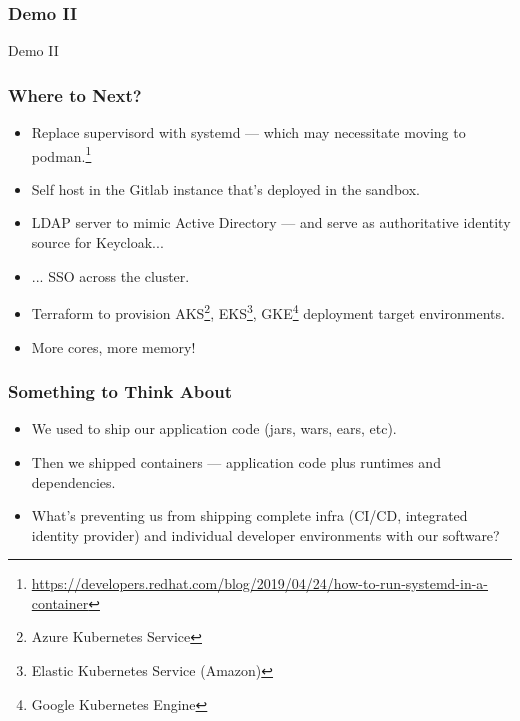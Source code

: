     \begin{frame}
      \frametitle{Demo II}
      \begin{center}
        {\Huge Demo II}
      \end{center}
    \end{frame}

    \begin{frame}
      \frametitle{Where to Next?}
      \begin{itemize}
        \item<2->Replace supervisord with systemd --- which may necessitate
          moving to podman.\footnote<2->{\href{https://developers.redhat.com/blog/2019/04/24/how-to-run-systemd-in-a-container}{https://developers.redhat.com/blog/2019/04/24/how-to-run-systemd-in-a-container}}
        \item<3->Self host in the Gitlab instance that's deployed in the sandbox.
        \item<4->LDAP server to mimic Active Directory --- and serve as
          authoritative identity source for Keycloak...
        \item<5->... SSO across the cluster.
        \item<6->Terraform to provision AKS\footnote<6->{Azure Kubernetes Service},
          EKS\footnote<6->{Elastic Kubernetes Service (Amazon)}, GKE\footnote<6->{Google
            Kubernetes Engine} deployment target environments.
        \item<7->More cores, more memory!
      \end{itemize}
    \end{frame}

    \begin{frame}
      \frametitle{Something to Think About}
      \begin{itemize}
      \item<2->We used to ship our application code (jars, wars, ears, etc).
      \item<3->Then we shipped containers --- application code plus runtimes and dependencies.
      \item<4->What's preventing us from shipping complete infra (CI/CD,
        integrated identity provider) and individual developer environments with our software?
      \end{itemize}
    \end{frame}

